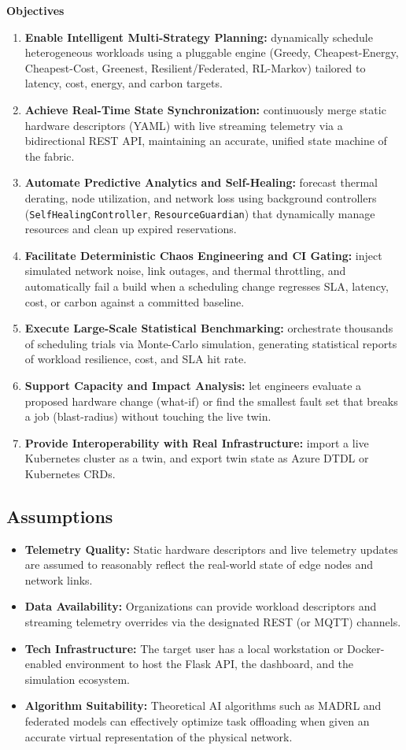 \documentclass[12pt,a4]{report}
\begin{document}
\textbf{Objectives}
\begin{enumerate}
    \item \textbf{Enable Intelligent Multi-Strategy Planning:} dynamically schedule heterogeneous workloads using a pluggable engine (Greedy, Cheapest-Energy, Cheapest-Cost, Greenest, Resilient/Federated, RL-Markov) tailored to latency, cost, energy, and carbon targets.
    \item \textbf{Achieve Real-Time State Synchronization:} continuously merge static hardware descriptors (YAML) with live streaming telemetry via a bidirectional REST API, maintaining an accurate, unified state machine of the fabric.
    \item \textbf{Automate Predictive Analytics and Self-Healing:} forecast thermal derating, node utilization, and network loss using background controllers (\texttt{SelfHealingController}, \texttt{ResourceGuardian}) that dynamically manage resources and clean up expired reservations.
    \item \textbf{Facilitate Deterministic Chaos Engineering and CI Gating:} inject simulated network noise, link outages, and thermal throttling, and automatically fail a build when a scheduling change regresses SLA, latency, cost, or carbon against a committed baseline.
    \item \textbf{Execute Large-Scale Statistical Benchmarking:} orchestrate thousands of scheduling trials via Monte-Carlo simulation, generating statistical reports of workload resilience, cost, and SLA hit rate.
    \item \textbf{Support Capacity and Impact Analysis:} let engineers evaluate a proposed hardware change (what-if) or find the smallest fault set that breaks a job (blast-radius) without touching the live twin.
    \item \textbf{Provide Interoperability with Real Infrastructure:} import a live Kubernetes cluster as a twin, and export twin state as Azure DTDL or Kubernetes CRDs.
\end{enumerate}

\subsection{Assumptions}

\begin{itemize}
    \item \textbf{Telemetry Quality:} Static hardware descriptors and live telemetry updates are assumed to reasonably reflect the real-world state of edge nodes and network links.
    \item \textbf{Data Availability:} Organizations can provide workload descriptors and streaming telemetry overrides via the designated REST (or MQTT) channels.
    \item \textbf{Tech Infrastructure:} The target user has a local workstation or Docker-enabled environment to host the Flask API, the dashboard, and the simulation ecosystem.
    \item \textbf{Algorithm Suitability:} Theoretical AI algorithms such as MADRL and federated models can effectively optimize task offloading when given an accurate virtual representation of the physical network.
\end{itemize}
\end{document}
